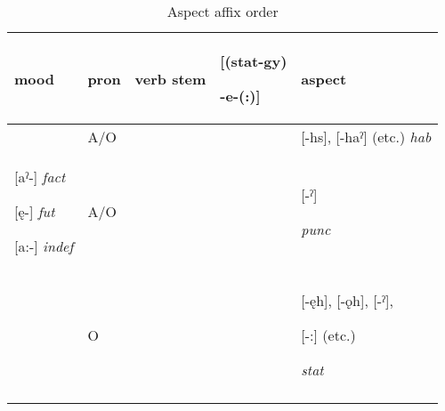 \begin{table}
\caption{Aspect affix order}
\label{tab:1:aspectaffixorder}
\scriptsize{
\begin{tabularx}{\textwidth}{XXXXX} 
\lsptoprule
mood & pron & verb stem & [(stat-gy)


{}-e-(:)] & aspect \\
\midrule
& A/O &  &  & [-hs], [-haˀ] (etc.) \textit{hab}

\\
{}[aˀ-] {\itshape fact}

[ę-] {\itshape fut}

[a:-] {\itshape indef}

& A/O &  &  & [-ˀ] 

\textit{punc}\\
& O &  &  & [-ęh], [-ǫh], [-ˀ], 

[-:] (etc.) 

\textit{stat}\\
\lspbottomrule
\end{tabularx}}
\end{table}



